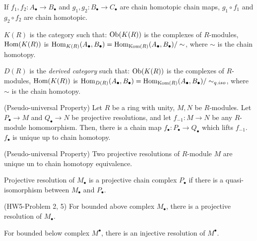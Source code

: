 \documentclass{article}
\begin{document}
\begin{theorem}
  If \(f_1, f_2: A_\bullet \to B_\bullet\) and \(g_1, g_2: B_\bullet \to C_\bullet\) are chain homotopic chain maps,
  \(g_1 \circ f_1\) and \(g_2 \circ f_2\) are chain homotopic.
\end{theorem}

\begin{definition}
  \(K(R)\) is the category such that:
  \(\textnormal{Ob}(K(R))\) is the complexes of \(R\)-modules,
  \(\textnormal{Hom}(K(R))\) is \(\textnormal{Hom}_{K(R)}(A_\bullet, B_\bullet) = \textnormal{Hom}_{\textnormal{Kom}(R)}(A_\bullet, B_\bullet) / \sim\),
  where \(\sim\) is the chain homotopy.
\end{definition}

\begin{definition}
  \(D(R)\) is the \emph{derived category} such that:
  \(\textnormal{Ob}(K(R))\) is the complexes of \(R\)-modules,
  \(\textnormal{Hom}(K(R))\) is \(\textnormal{Hom}_{D(R)}(A_\bullet, B_\bullet) = \textnormal{Hom}_{\textnormal{Kom}(R)}(A_\bullet, B_\bullet) / \sim_{q.iso}\),
  where \(\sim\) is the chain homotopy.
\end{definition}

\begin{theorem}(Pseudo-universal Property)
  Let \(R\) be a ring with unity,
  \(M, N\) be \(R\)-modules.
  Let \(P_\bullet \to M\) and \(Q_\bullet \to N\) be projective resolutions,
  and let \(f_{-1}: M \to N\) be any \(R\)-module homomorphism.
  Then, there is a chain map \(f_\bullet: P_\bullet \to Q_\bullet\)
  which lifts \(f_{-1}\).
  \(f_\bullet\) is unique up to chain homotopy.
\end{theorem}

\begin{theorem}(Pseudo-universal Property)
  Two projective resolutions of \(R\)-module \(M\)
  are unique un to chain homotopy equivalence.
\end{theorem}

\begin{definition}
  Projective resolution of \(M_\bullet\) is  a projective chain complex \(P_\bullet\)
  if there is a quasi-isomorphism between \(M_\bullet\) and \(P_\bullet\).
\end{definition}

\begin{theorem}(HW5-Problem 2, 5)
  For bounded above complex \(M_\bullet\), there is a projective resolution of \(M_\bullet\).

  For bounded below complex \(M^\bullet\), there is an injective resolution of \(M^\bullet\).
\end{theorem}
\end{document}
